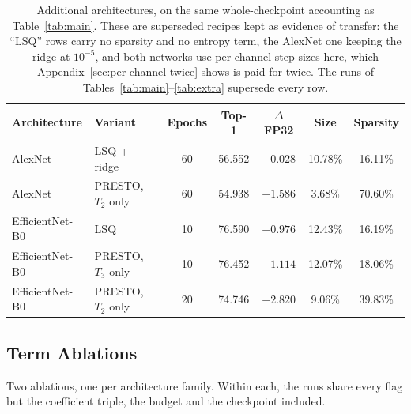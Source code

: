 \documentclass{article}
\begin{document}
\begin{table}[H]
  \caption{Additional architectures, on the same whole-checkpoint accounting as
  Table~\ref{tab:main}. These are superseded recipes kept as evidence of transfer:
  the ``LSQ'' rows carry no sparsity and no entropy term, the AlexNet one keeping
  the ridge at $10^{-5}$, and both networks use per-channel step sizes here, which
  Appendix~\ref{sec:per-channel-twice} shows is paid for twice. The runs of
  Tables~\ref{tab:main}--\ref{tab:extra} supersede every row.}
  \label{tab:cross-architecture}
  \centering
  \small
  \setlength{\tabcolsep}{4.5pt}
  \begin{tabular}{llccccc}
    \toprule
    Architecture & Variant & Epochs & Top-1 & $\Delta$ FP32 & Size & Sparsity \\
    \midrule
    AlexNet & LSQ + ridge & 60 & 56.552 & $+0.028$ & 10.78\% & 16.11\% \\
    AlexNet & PRESTO, $T_2$ only & 60 & 54.938 & $-1.586$ & 3.68\% & 70.60\% \\
    EfficientNet-B0 & LSQ & 10 & 76.590 & $-0.976$ & 12.43\% & 16.19\% \\
    EfficientNet-B0 & PRESTO, $T_3$ only & 10 & 76.452 & $-1.114$ & 12.07\% & 18.06\% \\
    EfficientNet-B0 & PRESTO, $T_2$ only & 20 & 74.746 & $-2.820$ & 9.06\% & 39.83\% \\
    \bottomrule
  \end{tabular}
\end{table}

\FloatBarrier

\subsection{Term Ablations}
\label{app:ablation}

Two ablations, one per architecture family. Within each, the runs share every
flag but the coefficient triple, the budget and the checkpoint included.
\end{document}
